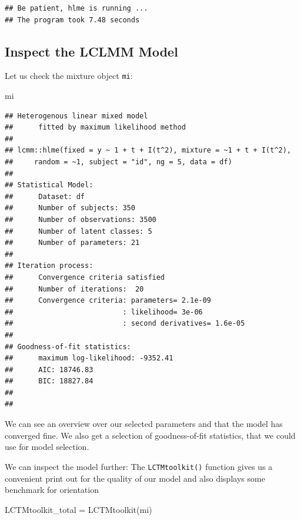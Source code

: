 \documentclass[
]{book}
\newenvironment{Shaded}{\begin{snugshade}}{\end{snugshade}}
\newcommand{\FunctionTok}[1]{\textcolor[rgb]{0.00,0.00,0.00}{#1}}
\newcommand{\NormalTok}[1]{#1}
\newcommand{\OtherTok}[1]{\textcolor[rgb]{0.56,0.35,0.01}{#1}}
\begin{document}
\begin{verbatim}
## Be patient, hlme is running ... 
## The program took 7.48 seconds
\end{verbatim}

\hypertarget{inspect-the-lclmm-model}{%
\subsection{Inspect the LCLMM Model}\label{inspect-the-lclmm-model}}

Let us check the mixture object \texttt{mi}:

\begin{Shaded}
\begin{Highlighting}[]
\NormalTok{mi}
\end{Highlighting}
\end{Shaded}

\begin{verbatim}
## Heterogenous linear mixed model 
##      fitted by maximum likelihood method 
##  
## lcmm::hlme(fixed = y ~ 1 + t + I(t^2), mixture = ~1 + t + I(t^2), 
##     random = ~1, subject = "id", ng = 5, data = df)
##  
## Statistical Model: 
##      Dataset: df 
##      Number of subjects: 350 
##      Number of observations: 3500 
##      Number of latent classes: 5 
##      Number of parameters: 21  
##  
## Iteration process: 
##      Convergence criteria satisfied 
##      Number of iterations:  20 
##      Convergence criteria: parameters= 2.1e-09 
##                          : likelihood= 3e-06 
##                          : second derivatives= 1.6e-05 
##  
## Goodness-of-fit statistics: 
##      maximum log-likelihood: -9352.41  
##      AIC: 18746.83  
##      BIC: 18827.84  
##  
## 
\end{verbatim}

We can see an overview over our selected parameters and that the model has converged fine. We also get a selection of goodness-of-fit statistics, that we could use for model selection.

We can inspect the model further: The \texttt{LCTMtoolkit()} function gives us a convenient print out for the quality of our model and also displays some benchmark for orientation

\begin{Shaded}
\begin{Highlighting}[]
\NormalTok{LCTMtoolkit\_total }\OtherTok{=} \FunctionTok{LCTMtoolkit}\NormalTok{(mi)}
\end{Highlighting}
\end{Shaded}
\end{document}
